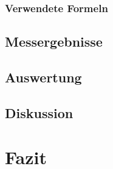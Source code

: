 \documentclass[12pt]{scrartcl}
\begin{document}
\subsubsection{Verwendete Formeln}
\subsection{Messergebnisse}
\subsection{Auswertung}
\subsection{Diskussion}

\section{Fazit}

\end{document}
